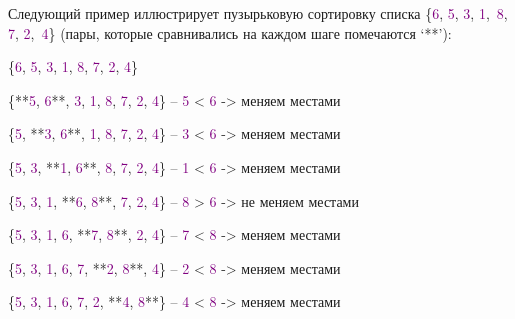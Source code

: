 Следующий пример иллюстрирует пузырьковую сортировку списка \{\textcolor{Purple}{6}, \textcolor{Purple}{5}, \textcolor{Purple}{3}, \textcolor{Purple}{1},\ \textcolor{Purple}{8}, \textcolor{Purple}{7}, \textcolor{Purple}{2},\ \textcolor{Purple}{4}\} (пары, которые сравнивались на каждом шаге помечаются ‘**’):

\vspace{\baselineskip}

\begin{tcolorbox} 
\{\textcolor{Purple}{6}, \textcolor{Purple}{5}, \textcolor{Purple}{3}, \textcolor{Purple}{1}, \textcolor{Purple}{8}, \textcolor{Purple}{7}, \textcolor{Purple}{2}, \textcolor{Purple}{4}\}

\{**\textcolor{Purple}{5}, \textcolor{Purple}{6}**, \textcolor{Purple}{3}, \textcolor{Purple}{1}, \textcolor{Purple}{8}, \textcolor{Purple}{7}, \textcolor{Purple}{2}, \textcolor{Purple}{4}\} -- \textcolor{Purple}{5} < \textcolor{Purple}{6} -> меняем местами

\{\textcolor{Purple}{5}, **\textcolor{Purple}{3}, \textcolor{Purple}{6}**, \textcolor{Purple}{1}, \textcolor{Purple}{8}, \textcolor{Purple}{7}, \textcolor{Purple}{2}, \textcolor{Purple}{4}\} -- \textcolor{Purple}{3} < \textcolor{Purple}{6} -> меняем местами

\{\textcolor{Purple}{5}, \textcolor{Purple}{3}, **\textcolor{Purple}{1}, \textcolor{Purple}{6}**, \textcolor{Purple}{8}, \textcolor{Purple}{7}, \textcolor{Purple}{2}, \textcolor{Purple}{4}\} -- \textcolor{Purple}{1} < \textcolor{Purple}{6} -> меняем местами

\{\textcolor{Purple}{5}, \textcolor{Purple}{3}, \textcolor{Purple}{1}, **\textcolor{Purple}{6}, \textcolor{Purple}{8}**, \textcolor{Purple}{7}, \textcolor{Purple}{2}, \textcolor{Purple}{4}\} -- \textcolor{Purple}{8} > \textcolor{Purple}{6} -> не меняем местами

\{\textcolor{Purple}{5}, \textcolor{Purple}{3}, \textcolor{Purple}{1}, \textcolor{Purple}{6}, **\textcolor{Purple}{7}, \textcolor{Purple}{8}**, \textcolor{Purple}{2}, \textcolor{Purple}{4}\} -- \textcolor{Purple}{7} < \textcolor{Purple}{8} -> меняем местами

\{\textcolor{Purple}{5}, \textcolor{Purple}{3}, \textcolor{Purple}{1}, \textcolor{Purple}{6}, \textcolor{Purple}{7}, **\textcolor{Purple}{2}, \textcolor{Purple}{8}**, \textcolor{Purple}{4}\} -- \textcolor{Purple}{2} < \textcolor{Purple}{8} -> меняем местами

\{\textcolor{Purple}{5}, \textcolor{Purple}{3}, \textcolor{Purple}{1}, \textcolor{Purple}{6}, \textcolor{Purple}{7}, \textcolor{Purple}{2}, **\textcolor{Purple}{4}, \textcolor{Purple}{8}**\} -- \textcolor{Purple}{4} < \textcolor{Purple}{8} -> меняем местами
\end{tcolorbox}

